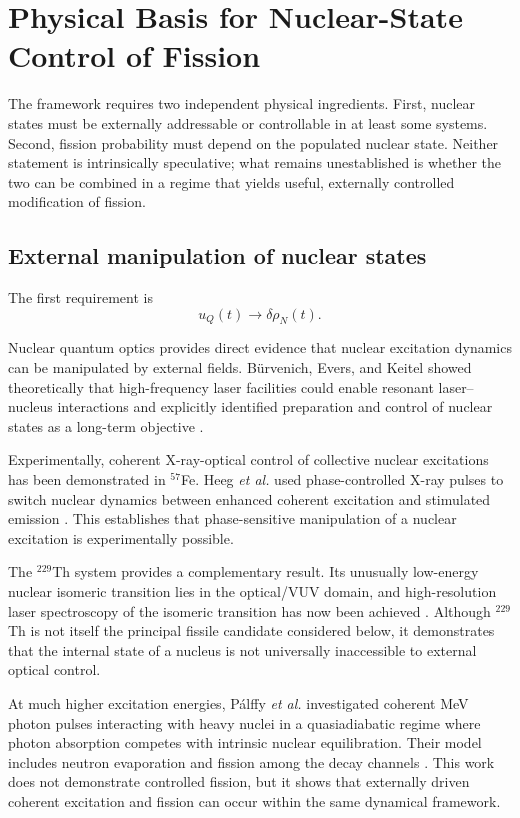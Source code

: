 \section{Physical Basis for Nuclear-State Control of Fission}
\label{sec:physical_basis}

The framework requires two independent physical ingredients. First, nuclear states must be externally addressable or controllable in at least some systems. Second, fission probability must depend on the populated nuclear state. Neither statement is intrinsically speculative; what remains unestablished is whether the two can be combined in a regime that yields useful, externally controlled modification of fission.

\subsection{External manipulation of nuclear states}

The first requirement is
\begin{equation}
u_Q(t)
\longrightarrow
\delta\rho_N(t).
\end{equation}

Nuclear quantum optics provides direct evidence that nuclear excitation dynamics can be manipulated by external fields. Bürvenich, Evers, and Keitel showed theoretically that high-frequency laser facilities could enable resonant laser--nucleus interactions and explicitly identified preparation and control of nuclear states as a long-term objective \cite{Buervenich2006}.

Experimentally, coherent X-ray-optical control of collective nuclear excitations has been demonstrated in $^{57}$Fe. Heeg \textit{et al.} used phase-controlled X-ray pulses to switch nuclear dynamics between enhanced coherent excitation and stimulated emission \cite{Heeg2021}. This establishes that phase-sensitive manipulation of a nuclear excitation is experimentally possible.

The $^{229}$Th system provides a complementary result. Its unusually low-energy nuclear isomeric transition lies in the optical/VUV domain, and high-resolution laser spectroscopy of the isomeric transition has now been achieved \cite{Yamaguchi2024}. Although $^{229}$Th is not itself the principal fissile candidate considered below, it demonstrates that the internal state of a nucleus is not universally inaccessible to external optical control.

At much higher excitation energies, Pálffy \textit{et al.} investigated coherent MeV photon pulses interacting with heavy nuclei in a quasiadiabatic regime where photon absorption competes with intrinsic nuclear equilibration. Their model includes neutron evaporation and fission among the decay channels \cite{Palffy2015}. This work does not demonstrate controlled fission, but it shows that externally driven coherent excitation and fission can occur within the same dynamical framework.


